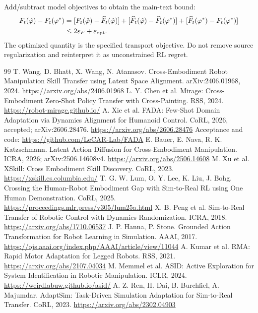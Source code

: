 \documentclass[11pt]{article}
\begin{document}
Add/subtract model objectives to obtain the main-text bound:
\begin{align}
 F_t(\hat\varphi)-F_t(\varphi^*)
 &= [F_t(\hat\varphi)-\widehat F_t(\hat\varphi)]
 +[\widehat F_t(\hat\varphi)-\widehat F_t(\varphi^*)]
 +[\widehat F_t(\varphi^*)-F_t(\varphi^*)]\\
 &\le2\varepsilon_F+\varepsilon_{\rm opt}.
\end{align}
The optimized quantity is the specified transport objective. Do not remove source
regularization and reinterpret it as unconstrained RL regret.

\begin{thebibliography}{99}
\small
{} T. Wang, D. Bhatt, X. Wang, N. Atanasov. Cross-Embodiment Robot Manipulation Skill Transfer using Latent Space Alignment. arXiv:2406.01968, 2024. \url{https://arxiv.org/abs/2406.01968}
 L. Y. Chen et al. Mirage: Cross-Embodiment Zero-Shot Policy Transfer with Cross-Painting. RSS, 2024. \url{https://robot-mirage.github.io/}
 A. Xie et al. FADA: Few-Shot Domain Adaptation via Dynamics Alignment for Humanoid Control. CoRL, 2026, accepted; arXiv:2606.28476. \url{https://arxiv.org/abs/2606.28476} Acceptance and code: \url{https://github.com/LeCAR-Lab/FADA}
 E. Bauer, E. Nava, R. K. Katzschmann. Latent Action Diffusion for Cross-Embodiment Manipulation. ICRA, 2026; arXiv:2506.14608v4. \url{https://arxiv.org/abs/2506.14608}
 M. Xu et al. XSkill: Cross Embodiment Skill Discovery. CoRL, 2023. \url{https://xskill.cs.columbia.edu/}
 T. G. W. Lum, O. Y. Lee, K. Liu, J. Bohg. Crossing the Human-Robot Embodiment Gap with Sim-to-Real RL using One Human Demonstration. CoRL, 2025. \url{https://proceedings.mlr.press/v305/lum25a.html}
 X. B. Peng et al. Sim-to-Real Transfer of Robotic Control with Dynamics Randomization. ICRA, 2018. \url{https://arxiv.org/abs/1710.06537}
 J. P. Hanna, P. Stone. Grounded Action Transformation for Robot Learning in Simulation. AAAI, 2017. \url{https://ojs.aaai.org/index.php/AAAI/article/view/11044}
 A. Kumar et al. RMA: Rapid Motor Adaptation for Legged Robots. RSS, 2021. \url{https://arxiv.org/abs/2107.04034}
 M. Memmel et al. ASID: Active Exploration for System Identification in Robotic Manipulation. ICLR, 2024. \url{https://weirdlabuw.github.io/asid/}
 A. Z. Ren, H. Dai, B. Burchfiel, A. Majumdar. AdaptSim: Task-Driven Simulation Adaptation for Sim-to-Real Transfer. CoRL, 2023. \url{https://arxiv.org/abs/2302.04903}

\end{thebibliography}
\end{document}
